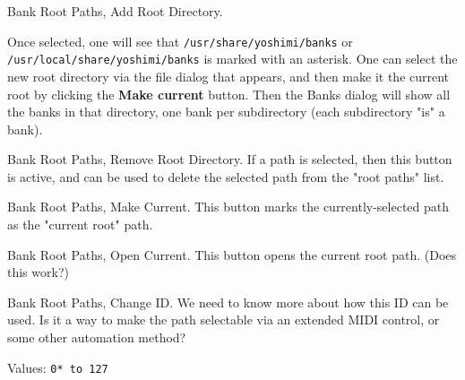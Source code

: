    \setcounter{ItemCounter}{0}      %

   Bank Root Paths, Add Root Directory.

   Once selected, one will see that
   \texttt{/usr/share/yoshimi/banks} or
   \texttt{/usr/local/share/yoshimi/banks}
   is marked with an asterisk.  One can select the new root directory via the
   file dialog that appears, and then make it the current root by clicking the
   \textbf{Make current} button.  Then the Banks dialog will show all the banks
   in that directory, one bank per subdirectory (each subdirectory "is" a
   bank).

   Bank Root Paths, Remove Root Directory.
   If a path is selected, then this button is active, and can be used to
   delete the selected path from the "root paths" list.

   Bank Root Paths, Make Current.
   This button marks the currently-selected path as the "current root" path.

   Bank Root Paths, Open Current.
   This button opens the current root path.
   (Does this work?)

   Bank Root Paths, Change ID.
   We need to know more about how this ID can be used.
   Is it a way to make the path selectable via an extended MIDI control, or
   some other automation method?

   Values: \texttt{0* to 127}

